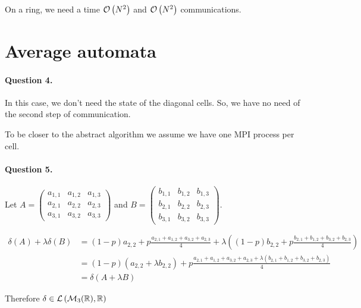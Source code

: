 On a ring, we need a time $\mathcal O \left( N^2 \right)$ and $\mathcal O \left( N^2 \right)$ communications.


\section{Average automata}

\paragraph{Question 4.}

In this case, we don't need the state of the diagonal cells. So, we have no need of the second step of communication.

To be closer to the abstract algorithm we assume we have one MPI process per cell.

\paragraph{Question 5.}

Let $A=
        \left(
            \begin{matrix}
                a_{1,1} & a_{1,2} & a_{1,3} \\ 
                a_{2,1} & a_{2,2} & a_{2,3} \\ 
                a_{3,1} & a_{3,2} & a_{3,3}
            \end{matrix}
        \right)$
         and 
    $B = 
        \left(
            \begin{matrix}
                b_{1,1} & b_{1,2} & b_{1,3} \\ 
                b_{2,1} & b_{2,2} & b_{2,3} \\ 
                b_{3,1} & b_{3,2} & b_{3,3}
            \end{matrix}
        \right)$.

$$
    \begin{aligned}
        \delta(A) + \lambda\delta(B) &= (1-p) a_{2,2} + p\frac{a_{2,1}+a_{1,2}+a_{3,2}+a_{2,3}}{4} + \lambda\left( (1-p) b_{2,2} + p\frac{b_{2,1}+b_{1,2}+b_{3,2}+b_{2,3}}{4} \right)\\
        &= (1-p) (a_{2,2} + \lambda b_{2,2}) + p\frac{a_{2,1}+a_{1,2}+a_{3,2}+a_{2,3} + \lambda (b_{2,1}+b_{1,2}+b_{3,2}+b_{2,3})}{4}\\
        &=\delta(A + \lambda B)
    \end{aligned}
$$

Therefore $\delta \in \mathcal{L}\left( \mathcal{M}_3(\mathbb{R}), \mathbb{R}\right)$

